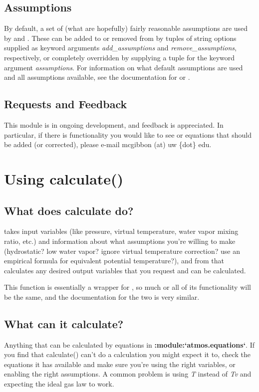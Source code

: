 \documentclass[letterpaper,10pt,english]{sphinxmanual}
\begin{document}
\section{Assumptions}
\label{intro:assumptions}
By default, a set of (what are hopefully) fairly reasonable assumptions are
used by  and . These can be
added to or removed from
by tuples of string options supplied as keyword arguments \emph{add\_assumptions}
and \emph{remove\_assumptions}, respectively, or completely overridden by supplying
a tuple for the keyword argument \emph{assumptions}. For information on what
default assumptions are used and all assumptions available, see the
documentation for  or .


\section{Requests and Feedback}
\label{intro:requests-and-feedback}
This module is in ongoing development, and feedback is appreciated. In
particular, if there is functionality you would like to see or equations
that should be added (or corrected), please e-mail mcgibbon (at) uw \{dot\} edu.


\chapter{Using calculate()}
\label{calculate:using-calculate}\label{calculate::doc}

\section{What does calculate do?}
\label{calculate:what-does-calculate-do}
 takes input variables (like
pressure, virtual temperature, water vapor mixing ratio, etc.) and information
about what assumptions you're willing to make (hydrostatic? low water vapor?
ignore virtual temperature correction? use an empirical formula for
equivalent potential temperature?), and from that calculates any desired
output variables that you request and can be calculated.

This function is essentially a wrapper for , so
much or all of its functionality will be the same, and the documentation for
the two is very similar.


\section{What can it calculate?}
\label{calculate:what-can-it-calculate}
Anything that can be calculated by equations in {\color{red}\bfseries{}:module:{}`atmos.equations{}`}.
If you find that calculate() can't do a calculation you might expect it
to, check the equations it has available and make sure you're using the right
variables, or enabling the right assumptions. A common problem is using \emph{T}
instead of \emph{Tv} and expecting the ideal gas law to work.
\end{document}
